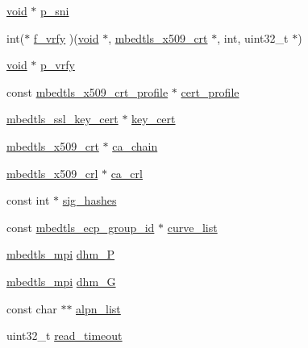 \begin{DoxyCompactItemize}
\item 
\hyperlink{interfacevoid}{void} $\ast$ \hyperlink{structmbedtls__ssl__config_a1ae68f4bd072068c60222866c0ea2f62}{p\+\_\+sni}
\item 
int($\ast$ \hyperlink{structmbedtls__ssl__config_ab79f1ffbe0f2ee8519f22fd6611dbb63}{f\+\_\+vrfy} )(\hyperlink{interfacevoid}{void} $\ast$, \hyperlink{structmbedtls__x509__crt}{mbedtls\+\_\+x509\+\_\+crt} $\ast$, int, uint32\+\_\+t $\ast$)
\item 
\hyperlink{interfacevoid}{void} $\ast$ \hyperlink{structmbedtls__ssl__config_ac59c71efac4d612c645e703941efae51}{p\+\_\+vrfy}
\item 
const \hyperlink{structmbedtls__x509__crt__profile}{mbedtls\+\_\+x509\+\_\+crt\+\_\+profile} $\ast$ \hyperlink{structmbedtls__ssl__config_a72c287eeb318ef4975b28619d0413419}{cert\+\_\+profile}
\item 
\hyperlink{structmbedtls__ssl__key__cert}{mbedtls\+\_\+ssl\+\_\+key\+\_\+cert} $\ast$ \hyperlink{structmbedtls__ssl__config_afbcfe1cdb3e42ee1d1e14352cefde29e}{key\+\_\+cert}
\item 
\hyperlink{structmbedtls__x509__crt}{mbedtls\+\_\+x509\+\_\+crt} $\ast$ \hyperlink{structmbedtls__ssl__config_a4087cd54ed61e8a5792725e0fcdf1321}{ca\+\_\+chain}
\item 
\hyperlink{structmbedtls__x509__crl}{mbedtls\+\_\+x509\+\_\+crl} $\ast$ \hyperlink{structmbedtls__ssl__config_a2ccccedcad4f76e3337a4b530cedc3a2}{ca\+\_\+crl}
\item 
const int $\ast$ \hyperlink{structmbedtls__ssl__config_a82552e1dd3c9065ef98e2835fc925653}{sig\+\_\+hashes}
\item 
const \hyperlink{ecp_8h_af79e530ea8f8416480f805baa20b1a2d}{mbedtls\+\_\+ecp\+\_\+group\+\_\+id} $\ast$ \hyperlink{structmbedtls__ssl__config_a388e40cfcaadba5c07bf625c7dba18e0}{curve\+\_\+list}
\item 
\hyperlink{structmbedtls__mpi}{mbedtls\+\_\+mpi} \hyperlink{structmbedtls__ssl__config_af6043fc1d3fd43d571ec8faa9de3906d}{dhm\+\_\+P}
\item 
\hyperlink{structmbedtls__mpi}{mbedtls\+\_\+mpi} \hyperlink{structmbedtls__ssl__config_af0d45b3fc7171e48a08d904b7383fbba}{dhm\+\_\+G}
\item 
const char $\ast$$\ast$ \hyperlink{structmbedtls__ssl__config_abed0cad3facb6f2b84ca53199ac629ab}{alpn\+\_\+list}
\item 
uint32\+\_\+t \hyperlink{structmbedtls__ssl__config_a8f32ca22ea20b3848176d78390c13153}{read\+\_\+timeout}
\item 
$$
\end{DoxyCompactItemize}
